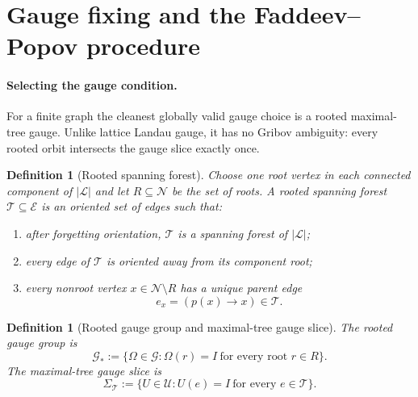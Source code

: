 \documentclass[11pt]{article}
\newtheorem{definition}[theorem]{Definition}
\theoremstyle{remark}
\newcommand{\mcN}{\mathcal N}
\newcommand{\mcE}{\mathcal E}
\newcommand{\mcT}{\mathcal T}
\newcommand{\mcG}{\mathcal G}
\newcommand{\mcU}{\mathscr U}
\begin{document}
\section{Gauge fixing and the Faddeev--Popov procedure}
\label{sec:gauge-fixing}

\paragraph{Selecting the gauge condition.}
For a finite graph the cleanest globally valid gauge choice is a rooted
maximal-tree gauge.  Unlike lattice Landau gauge, it has no Gribov ambiguity:
every rooted orbit intersects the gauge slice exactly once.

\begin{definition}[Rooted spanning forest]
\label{def:tree}
Choose one root vertex in each connected component of $|\mathcal L|$ and let
$R\subseteq\mcN$ be the set of roots.  A \emph{rooted spanning forest}
$\mcT\subseteq\mcE$ is an oriented set of edges such that:
\begin{enumerate}[leftmargin=1.5em]
\item after forgetting orientation, $\mcT$ is a spanning forest of $|\mathcal L|$;
\item every edge of $\mcT$ is oriented away from its component root;
\item every nonroot vertex $x\in\mcN\setminus R$ has a unique parent edge
\[
e_x=(p(x)\to x)\in\mcT.
\]
\end{enumerate}
\end{definition}

\begin{definition}[Rooted gauge group and maximal-tree gauge slice]
\label{def:rooted-gauge}
The rooted gauge group is
\[
\mcG_*:=\{\Omega\in\mcG:\Omega(r)=I\ \text{for every root } r\in R\}.
\]
The maximal-tree gauge slice is
\[
\Sigma_{\mcT}:=\{U\in\mcU:U(e)=I\ \text{for every } e\in\mcT\}.
\]
\end{definition}
\end{document}
